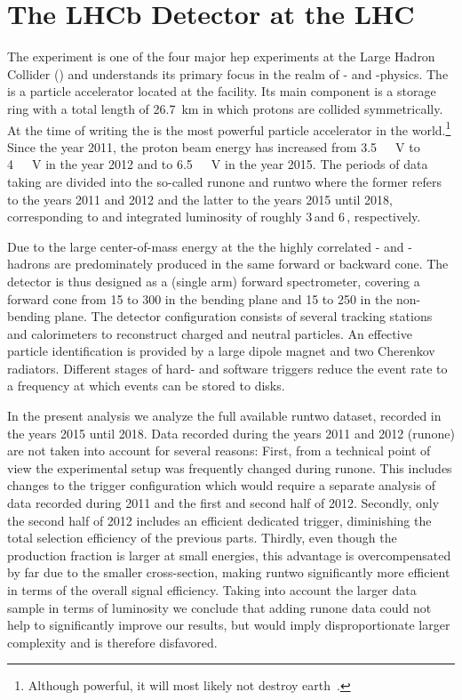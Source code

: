\chapter{The LHCb Detector at the LHC}
\label{chap:detector}
The \lhcb experiment is one of the four major \gls{hep} experiments at the Large Hadron Collider (\lhc) and understands its primary focus in the realm of \bquark- and \cquark-physics.
The  \lhc is a particle accelerator located at the \cern facility.
Its main component is a storage ring with a total length of \SI{26.7}{\kilo\meter} in which protons are collided symmetrically.
At the time of writing the \lhc is the most powerful particle accelerator in the world.\footnote{Although powerful, it will most likely not destroy earth~\cite{lhcdestroyworld1,lhcdestroyworld2}.}
Since the year 2011, the proton beam energy has increased from \SI{3.5}{\tera\electron\volt} to \SI{4}{\tera\electron\volt} in the year 2012 and to \SI{6.5}{\tera\electron\volt} in the year 2015.
The periods of data taking are divided into the so-called \gls{runone} and \gls{runtwo} where the former refers to the years 2011 and 2012 and the latter to the years 2015 until 2018, corresponding to and integrated luminosity of roughly 3\,\invfb and 6\,\invfb, respectively.

Due to the large center-of-mass energy at the \lhc the highly correlated \bquark- and \bquarkbar-hadrons are predominately produced in the same forward or backward cone.
The \lhcb detector is thus designed as a (single arm) forward spectrometer, covering a forward cone from \SI{15}{\mrad} to \SI{300}{\mrad} in the bending plane and \SI{15}{\mrad} to \SI{250}{\mrad} in the non-bending plane.
The detector configuration consists of several tracking stations and calorimeters to reconstruct charged and neutral particles.
An effective particle identification is provided by a large dipole magnet and two Cherenkov radiators.
Different stages of hard- and software triggers reduce the event rate to a frequency at which events can be stored to disks.

In the present analysis we analyze the full available \gls{runtwo} dataset, recorded in the years 2015 until 2018.
Data recorded during the years 2011 and 2012 (\gls{runone}) are not taken into account for several reasons: First, from a technical point of view the experimental setup was frequently changed during \gls{runone}.
This includes changes to the trigger configuration which would require a separate analysis of data recorded during 2011 and the first and second half of 2012.
Secondly, only the second half of 2012 includes an efficient dedicated \Lz trigger, diminishing the total selection efficiency of the previous parts.
Thirdly, even though the \Lb production fraction is larger at small energies, this advantage is overcompensated by far due to the smaller \bbbar cross-section, making \gls{runtwo} significantly more efficient in terms of the overall signal efficiency.
Taking into account the larger data sample in terms of luminosity we conclude that adding \gls{runone} data could not help to significantly improve our results, but would imply disproportionate larger complexity and is therefore disfavored.

